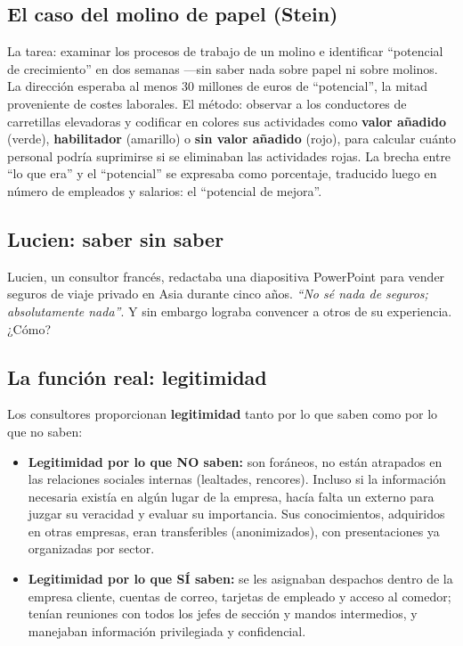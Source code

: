 \documentclass[a4paper,12pt]{article}
\begin{document}
\subsection*{El caso del molino de papel (Stein)}

La tarea: examinar los procesos de trabajo de un molino e identificar ``potencial de crecimiento'' en dos semanas ---sin saber nada sobre papel ni sobre molinos. La dirección esperaba al menos 30 millones de euros de ``potencial'', la mitad proveniente de costes laborales. El método: observar a los conductores de carretillas elevadoras y codificar en colores sus actividades como \textbf{valor añadido} (verde), \textbf{habilitador} (amarillo) o \textbf{sin valor añadido} (rojo), para calcular cuánto personal podría suprimirse si se eliminaban las actividades rojas. La brecha entre ``lo que era'' y el ``potencial'' se expresaba como porcentaje, traducido luego en número de empleados y salarios: el ``potencial de mejora''.

\subsection*{Lucien: saber sin saber}

Lucien, un consultor francés, redactaba una diapositiva PowerPoint para vender seguros de viaje privado en Asia durante cinco años. \textit{``No sé nada de seguros; absolutamente nada''}. Y sin embargo lograba convencer a otros de su experiencia. ¿Cómo?

\subsection*{La función real: legitimidad}

Los consultores proporcionan \textbf{legitimidad} tanto por lo que saben como por lo que no saben:

\begin{itemize}
  \item \textbf{Legitimidad por lo que NO saben:} son foráneos, no están atrapados en las relaciones sociales internas (lealtades, rencores). Incluso si la información necesaria existía en algún lugar de la empresa, hacía falta un externo para juzgar su veracidad y evaluar su importancia. Sus conocimientos, adquiridos en otras empresas, eran transferibles (anonimizados), con presentaciones ya organizadas por sector.
  \item \textbf{Legitimidad por lo que SÍ saben:} se les asignaban despachos dentro de la empresa cliente, cuentas de correo, tarjetas de empleado y acceso al comedor; tenían reuniones con todos los jefes de sección y mandos intermedios, y manejaban información privilegiada y confidencial.
\end{itemize}
\end{document}
